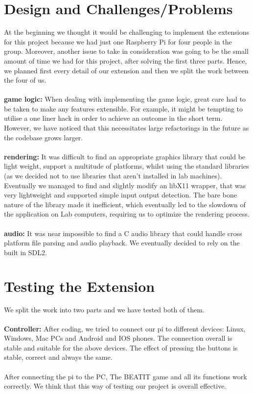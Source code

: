\documentclass[a4paper]{article}
\begin{document}
\section{Design and Challenges/Problems}
At the beginning we thought it would be challenging to implement the extensions for this project because we had just one Raspberry Pi for four people in the group. 
Moreover, another issue to take in consideration was going to be the small amount of time we had for this project, after solving the first three parts. Hence, we planned first every detail of our extension and then we split the work between the four of us.
\\\\
\textbf{game logic:} When dealing with implementing the game logic, great care had to be taken to make any features extensible. For example, it might be tempting to utilise a one liner hack in order to achieve an outcome in the short term. However, we have noticed that this necessitates large refactorings in the future as the codebase grows larger.
\\\\
\textbf{rendering:} It was difficult to find an appropriate graphics library that could be light weight, support a multitude of platforms, whilst using the standard libraries (as we decided not to use libraries that aren't installed in lab machines). Eventually we managed to find and slightly modify an libX11 wrapper, that was very lightweight and supported simple input output detection. The bare bone nature of the library made it inefficient, which eventually led to the slowdown of the application on Lab computers, requiring us to optimize the rendering process. 
\\\\
\textbf{audio:} It was near impossible to find a C audio library that could handle cross platform file parsing and audio playback. We eventually decided to rely on the built in SDL2.
\section{Testing the Extension}
We split the work into two parts and we have tested both of them.
\\\\
\textbf{Controller:} After coding, we tried to connect our pi to different devices: Linux, Windows, Mac PCs and Android and IOS phones. The connection overall is stable and suitable for the above devices. The effect of pressing the buttons is stable, correct and always the same.
\\\\
After connecting the pi to the PC, The BEATIT game and all its functions work correctly.
We think that this way of testing our project is overall effective.
\end{document}
